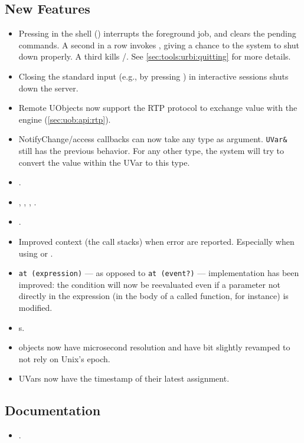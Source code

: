 \subsection{New Features}
\begin{itemize}
\item Pressing  in the \us shell () interrupts
  the foreground job, and clears the pending commands.  A second
   in a row invokes , giving a
  chance to the system to shut down properly.  A third  kills
  /.  See
  \autoref{sec:tools:urbi:quitting} for more details.
\item Closing the standard input (e.g., by pressing ) in
  interactive sessions shuts down the server.
\item Remote UObjects now support the RTP protocol to exchange value with
  the engine (\autoref{sec:uob:api:rtp}).
\item NotifyChange/access callbacks can now take any type as argument.
  \lstinline|UVar&| still has the previous behavior. For any other type,
  the system will try to convert the value within the UVar to this type.
\item {}.
\item {}, , ,
  .
\item {}.
\item Improved context (the call stacks) when error are reported.
  Especially when using  or .
\item \lstinline|at (expression)| --- as opposed to \lstinline|at (event?)| ---
  implementation has been improved: the condition will now be reevaluated even
  if a parameter not directly in the expression (in the body of a called
  function, for instance) is modified.
\item {}s.
\item {} objects now have microsecond resolution and
  have bit slightly revamped to not rely on Unix's epoch.
\item UVars now have the timestamp of their latest assignment.
\end{itemize}

\subsection{Documentation}
\begin{itemize}
\item {}.
\end{itemize}

